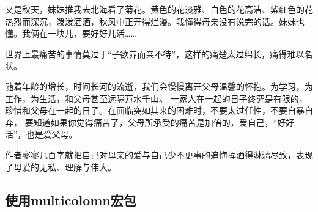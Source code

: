 \documentclass[fontset=windows]{article}
\begin{document}
又是秋天，妹妹推我去北海看了菊花。黄色的花淡雅、白色的花高洁、紫红色的花热烈而深沉，泼泼洒洒，秋风中正开得烂漫。我懂得母亲没有说完的话。妹妹也懂。我俩在一块儿，要好好儿活……
\clearpage
\onecolumn
{}\par
{
    \kaishu
    世界上最痛苦的事情莫过于“子欲养而亲不待”，这样的痛楚太过绵长，痛得难以名状。

    随着年龄的增长，时间长河的流逝，我们会慢慢离开父母温馨的怀抱。为学习，为工作，为生活，和父母甚至远隔万水千山。
    一家人在一起的日子终究是有限的，珍惜和父母在一起的日子。在面临突如其来的困难时，不要太过任性，不要自暴自弃，
    要知道如果你觉得痛苦了，父母所承受的痛苦是加倍的，爱自己，“好好活”，也是爱父母。

    作者寥寥几百字就把自己对母亲的爱与自己少不更事的追悔挥洒得淋漓尽致，表现了母爱的无私、理解与伟大。
}
\newpage

\subsection{使用multicolomn宏包}

\end{document}
